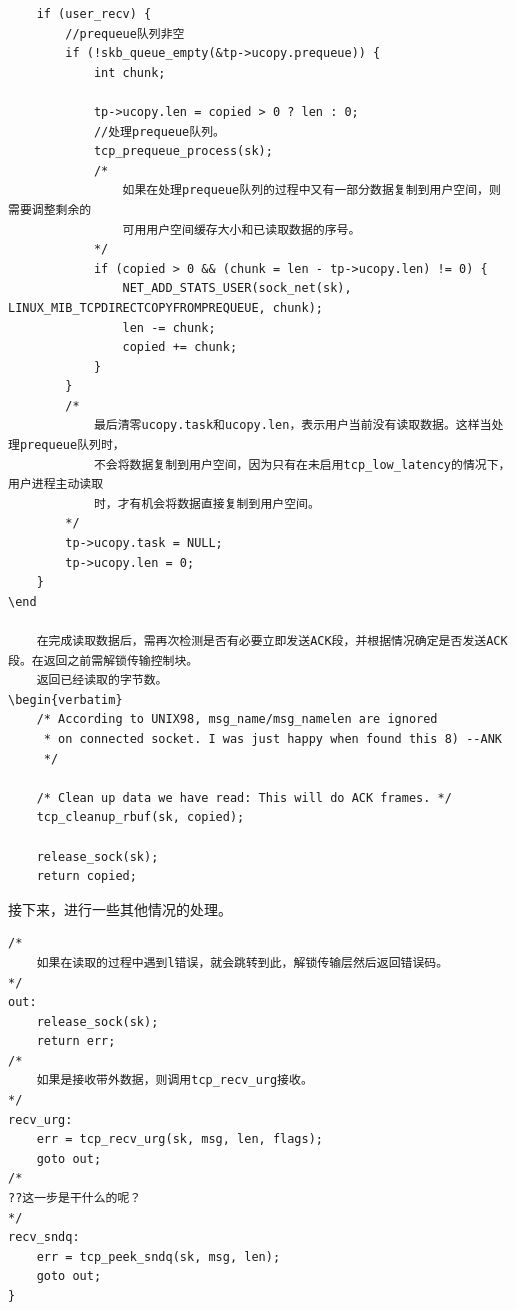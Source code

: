     
\begin{verbatim}
    if (user_recv) {
        //prequeue队列非空
        if (!skb_queue_empty(&tp->ucopy.prequeue)) {
            int chunk;

            tp->ucopy.len = copied > 0 ? len : 0;
            //处理prequeue队列。
            tcp_prequeue_process(sk);
            /*
                如果在处理prequeue队列的过程中又有一部分数据复制到用户空间，则需要调整剩余的
                可用用户空间缓存大小和已读取数据的序号。
            */
            if (copied > 0 && (chunk = len - tp->ucopy.len) != 0) {
                NET_ADD_STATS_USER(sock_net(sk), LINUX_MIB_TCPDIRECTCOPYFROMPREQUEUE, chunk);
                len -= chunk;
                copied += chunk;
            }
        }
        /*
            最后清零ucopy.task和ucopy.len，表示用户当前没有读取数据。这样当处理prequeue队列时，
            不会将数据复制到用户空间，因为只有在未启用tcp_low_latency的情况下，用户进程主动读取
            时，才有机会将数据直接复制到用户空间。
        */
        tp->ucopy.task = NULL;
        tp->ucopy.len = 0;
    }
\end
    
    在完成读取数据后，需再次检测是否有必要立即发送ACK段，并根据情况确定是否发送ACK段。在返回之前需解锁传输控制块。
    返回已经读取的字节数。
\begin{verbatim}
    /* According to UNIX98, msg_name/msg_namelen are ignored
     * on connected socket. I was just happy when found this 8) --ANK
     */

    /* Clean up data we have read: This will do ACK frames. */
    tcp_cleanup_rbuf(sk, copied);

    release_sock(sk);
    return copied;
\end{verbatim}
    接下来，进行一些其他情况的处理。
\begin{verbatim}
/*
    如果在读取的过程中遇到l错误，就会跳转到此，解锁传输层然后返回错误码。
*/
out:
    release_sock(sk);
    return err;
/*
    如果是接收带外数据，则调用tcp_recv_urg接收。
*/
recv_urg:
    err = tcp_recv_urg(sk, msg, len, flags);
    goto out;
/*
??这一步是干什么的呢？
*/
recv_sndq:
    err = tcp_peek_sndq(sk, msg, len);
    goto out;
}
\end{verbatim}

